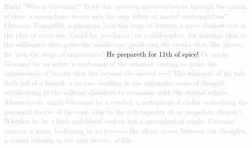 \textcolor{lightgray}{Hark! "Who is Giovanni?" Doth this question not reverberate through the annals of time, a conundrum woven into the very fabric of mortal contemplation? Giovanni Tranquillo, a phantom 'pon the stage of history, a mere shadow cast in the play of existence. Could he, perchance, be a philosopher, his musings akin to the soliloquies that grace the mindscape, pondering the truths that, like ghosts, flit 'pon the stage of appearance?} He prepareth for 11th of spice! \textcolor{lightgray}{Or might Giovanni be an artist, a craftsman of the ethereal, seeking to paint the quintessence of beauty that lies beyond the mortal eye? The whispers of his tale doth tell of a hermit, a recluse dwelling in the enigmatic caves of thought, withdrawing to the solitary chambers to commune with the eternal echoes. Alternatively, might Giovanni be a symbol, a metaphorical cipher embodying the perennial desires of the soul, akin to the rich tapestry of an unspoken allegory? Whether he be a flesh-and-blood soul or but a metaphorical shade, Giovanni remains a muse, beckoning us to traverse the silent spaces between our thoughts, a sonnet echoing in the vast theater of life.}\\
